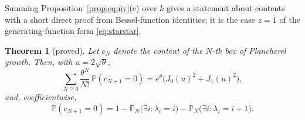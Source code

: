 \documentclass[11pt]{article}
\newtheorem{theorem}{Theorem}[section]
\theoremstyle{definition}
\theoremstyle{remark}
\newcommand{\Prob}{\mathbb{P}}
\begin{document}
Summing Proposition~\ref{prop:equiv}(c) over $k$ gives a statement about contents with a short direct proof from Bessel-function identities; it is the case $z=1$ of the generating-function form \eqref{eq:starstar}.

\begin{theorem}[proved]\label{thm:content0}
Let $c_N$ denote the content of the $N$-th box of Plancherel growth. Then, with $u=2\sqrt\theta$,
\begin{equation}\label{eq:content0}
\sum_{N\ge0}\frac{\theta^N}{N!}\,\Prob(c_{N+1}=0)=e^{\theta}\bigl(J_0(u)^2+J_1(u)^2\bigr),
\end{equation}
and, coefficientwise,
\begin{equation}\label{eq:content0N}
\Prob(c_{N+1}=0)=1-\Prob_N\bigl(\exists i:\lambda_i=i\bigr)-\Prob_N\bigl(\exists i:\lambda_i=i+1\bigr).
\end{equation}
\end{theorem}
\end{document}
